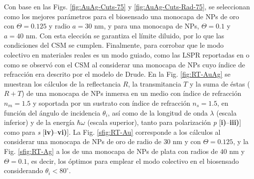 Con base en las Figs. \ref{fig:AuAg-Cuts-75} y \ref{fig:AuAg-Cuts-Rad-75}, se seleccionan como los mejores parámetros para el biosensado una monocapa de NPs de oro con $\Theta=0.125$ y radio $a=30$ nm, y para una monocapa de NPs, $\Theta=0.1$ y $a=40$ nm. Con esta elección se garantiza el límite diluido, por lo que las condiciones del CSM se cumplen. Finalmente, para corrobar que le modo colectivo en materiales reales es un modo guiado, como las LSPR reportadas en \cite{kabashin2009plasmonic} o como se observó con el CSM al considerar una monocapa de NPs cuyo índice de refracción era descrito por el modelo de Drude. En la Fig. \ref{fig:RT-AuAg} se  muestran los cálculos de la reflectancia $R$, la transmitancia $T$ y la suma de éstas ($R+T$) de una monocapa de NPs inmersa en un medio con índice de refracción $n_m=1.5$ y soportada por un sustrato con índice de refracción $n_s=1.5$, en función del ángulo de incidencia $\theta_i$, así como de la longitud de onda $\lambda$ (escala inferior) y de la energía  $\hbar\omega$ (escala superior), tanto para polarización \emph{p}  [\textbf{i)}--\textbf{iii)}] como para \emph{s} [\textbf{iv)}--\textbf{vi)}]. La Fig. \ref{sfig:RT-Au} corresponde a los cálculos al considerar una monocapa de NPs de oro de radio de $30$ nm y con $\Theta=0.125$, y la  Fig. \ref{sfig:RT-Ag} a los de una monocapa de NPs de plata con radios de $40$ nm y $\Theta=0.1$, es decir, los óptimos para emplear el modo colectivo en el biosensado considerando $\theta_i<80^\circ$.


